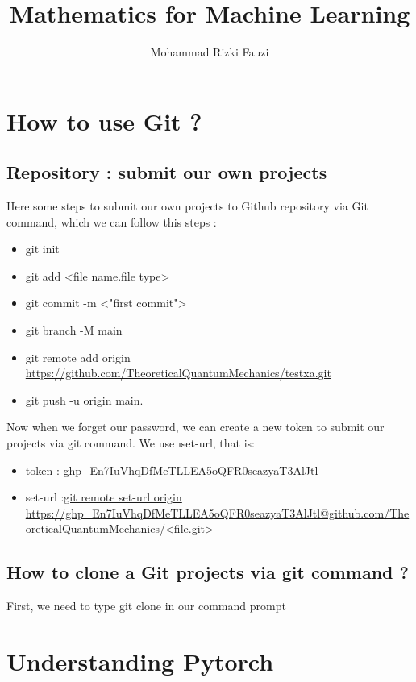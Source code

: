 \documentclass[a4paper,12pt]{book}
\title{Mathematics for Machine Learning}
\author{Mohammad Rizki Fauzi}
\begin{document}
\maketitle
\tableofcontents
\chapter{How to use Git ?}
\section{Repository : submit our own projects}\label{teil1}
Here some steps to submit our own projects to Github repository via Git command, which we can follow this steps :
\begin{itemize}
    \item git init
    \item git add <file name.file type>
    \item git commit -m <"first commit">
    \item git branch -M main
    \item git remote add origin \url{https://github.com/TheoreticalQuantumMechanics/testxa.git}
    \item git push -u origin main.
    
\end{itemize}

Now when we forget our password, we can create a new token to submit our projects via git command.
We use \i{set-url}, that is:
\begin{itemize}
    \item token : \url{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}
    \item set-url :\url{git remote set-url origin https://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@github.com/TheoreticalQuantumMechanics/<file.git> } 
\end{itemize}
 


\section{How to clone a Git projects via git command ?}
First, we need to type git clone in our command prompt

\chapter{Understanding Pytorch}
\end{document}
